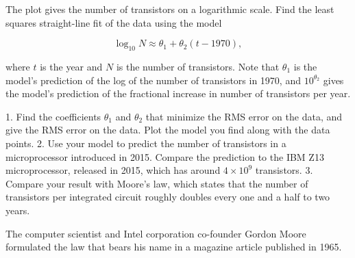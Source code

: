 The plot gives the number of transistors on a logarithmic scale. Find the least squares straight-line fit of the data using the model

\[\log_{10}N\approx\theta_{1}+\theta_{2}(t-1970),\]

where \(t\) is the year and \(N\) is the number of transistors. Note that \(\theta_{1}\) is the model's prediction of the log of the number of transistors in 1970, and \(10^{\theta_{2}}\) gives the model's prediction of the fractional increase in number of transistors per year.

1. Find the coefficients \(\theta_{1}\) and \(\theta_{2}\) that minimize the RMS error on the data, and give the RMS error on the data. Plot the model you find along with the data points.
2. Use your model to predict the number of transistors in a microprocessor introduced in 2015. Compare the prediction to the IBM Z13 microprocessor, released in 2015, which has around \(4\times 10^{9}\) transistors.
3. Compare your result with Moore's law, which states that the number of transistors per integrated circuit roughly doubles every one and a half to two years.

The computer scientist and Intel corporation co-founder Gordon Moore formulated the law that bears his name in a magazine article published in 1965.

